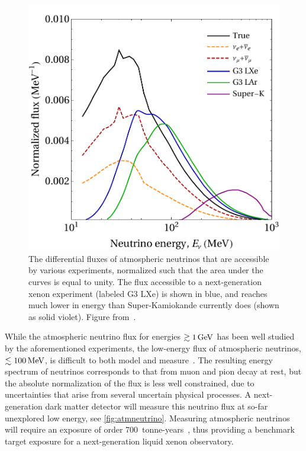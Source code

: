 \begin{figure}[!htbp]
    \centering
    \includegraphics[width=\columnwidth]{fig_fluxcomp.pdf}
    \caption{The differential fluxes of atmospheric neutrinos that are accessible by various experiments, normalized such that the area under the curves is equal to unity. The flux accessible to a next-generation xenon experiment (labeled G3 LXe) is shown in blue, and reaches much lower in energy than Super-Kamiokande currently does (shown as solid violet). Figure from~\cite{Newstead:2020fie}.}
    \label{fig:atmneutrino}
\end{figure}

While the atmospheric neutrino flux for energies $\gtrsim1\, \mathrm{GeV}$ has been well studied by the aforementioned experiments, the low-energy flux of atmospheric neutrinos, $\lesssim100\, \mathrm{MeV}$, is difficult to both model and measure~\cite{Battistoni:2005pd}. The resulting energy spectrum of neutrinos corresponds to that from muon and pion decay at rest, but the absolute normalization of the flux is less well constrained, due to uncertainties that arise from several uncertain physical processes. A next-generation dark matter detector will measure this neutrino flux at so-far unexplored low energy, see \autoref{fig:atmneutrino}. Measuring atmospheric neutrinos will require an exposure of order 700~tonne-years~\cite{Newstead:2020fie}, thus providing a benchmark target exposure for a next-generation liquid xenon observatory.

